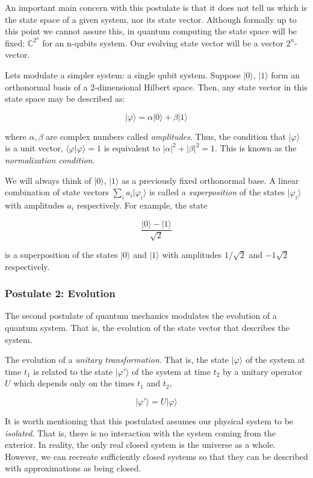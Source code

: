 An important main concern with this postulate is that it does not tell us which is the state space of a given system, nor its state vector. Although formally up to this point we cannot assure this, in quantum computing the state space will be fixed: $\mathds{C}^{2^n}$ for an n-qubits system. Our evolving state vector will be a vector $2^n$-vector.

Lets modulate a simpler system: a single qubit system. Suppose $|0\rangle$, $|1\rangle$ form an orthonormal basis of a 2-dimensional Hilbert space. Then, any state vector in this state space may be described as:

$$ |\varphi\rangle = \alpha|0\rangle + \beta|1\rangle $$

where $\alpha,\beta$ are complex numbers called \emph{amplitudes}. Thus, the condition that $|\varphi\rangle$ is a unit vector, $\langle\varphi|\varphi\rangle = 1$ is equivalent to $|\alpha|^2 + |\beta|^2 = 1$. This is known as the \emph{normalization condition}.

We will always think of $|0\rangle$, $|1\rangle$ as a previously fixed orthonormal base. A linear combination of state vectors $\sum_i a_i |\varphi_i\rangle$ is called a \emph{superposition} of the states $|\varphi_i\rangle$ with amplitudes $a_i$ respectively. For example, the state

$$ \frac{|0\rangle - |1\rangle}{\sqrt 2} $$

is a superposition of the states $|0\rangle$ and $|1\rangle$ with amplitudes $1/\sqrt 2$ and $-1\sqrt 2$ respectively.

\subsubsection{Postulate 2: Evolution}

The second postulate of quantum mechanics modulates the evolution of a quantum system. That is, the evolution of the state vector that describes the system.

\begin{postulate}
	The evolution of a \emph{unitary transformation}. That is, the state $|\varphi\rangle$ of the system at time $t_1$ is related to the state $|\varphi'\rangle$ of the system at time $t_2$ by a unitary operator $U$ which depends only on the times $t_1$ and $t_2$,
	
	$$ |\varphi'\rangle = U|\varphi\rangle $$
\end{postulate}

It is worth mentioning that this postulated assumes our physical system to be \emph{isolated}. That is, there is no interaction with the system coming from the exterior. In reality, the only real closed system is the universe as a whole. However, we can recreate sufficiently closed systems so that they can be described with approximations as being closed. 

